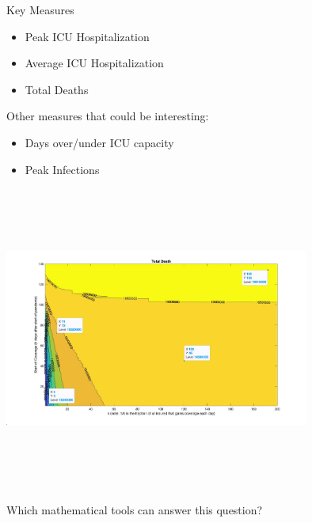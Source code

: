 \documentclass[notes]{beamer}
\begin{document}
\begin{frame}{Key Measures}

\begin{itemize}
  \item Peak ICU Hospitalization
    \item Average ICU Hospitalization
    \item Total Deaths
\end{itemize}

Other measures that could be interesting:
\begin{itemize}
    \item Days over/under ICU capacity
    \item Peak Infections
\end{itemize}

\includegraphics[width=10cm,height=10cm,keepaspectratio]{run.jpg}

\end{frame}

\begin{frame}{Which mathematical tools can answer this question?}






\end{frame}
\end{document}
